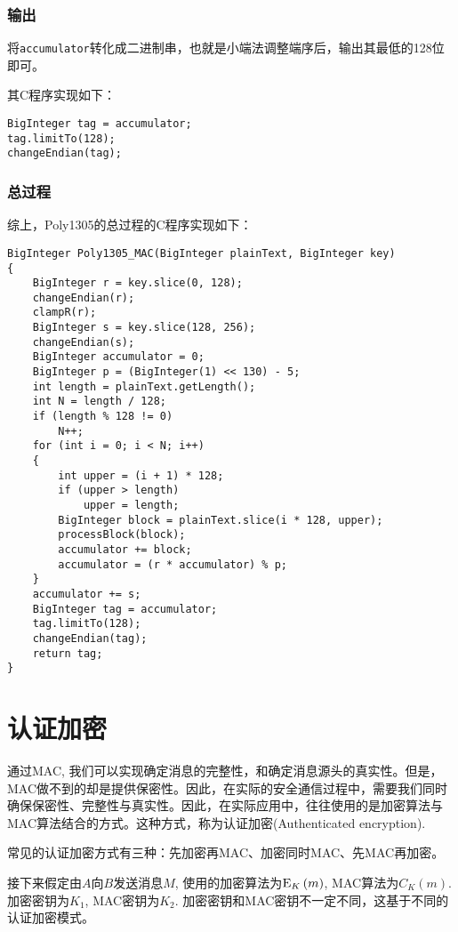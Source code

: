 \subsubsection{输出}
将\verb`accumulator`转化成二进制串，也就是小端法调整端序后，输出其最低的128位即可。\par
其C程序实现如下：
\begin{prove}
	\begin{verbatim}
BigInteger tag = accumulator;
tag.limitTo(128);
changeEndian(tag);
	\end{verbatim}
\end{prove}
\subsubsection{总过程}
综上，Poly1305的总过程的C程序实现如下：
\begin{prove}
	\begin{verbatim}
BigInteger Poly1305_MAC(BigInteger plainText, BigInteger key)
{
    BigInteger r = key.slice(0, 128);
    changeEndian(r);
    clampR(r);
    BigInteger s = key.slice(128, 256);
    changeEndian(s);
    BigInteger accumulator = 0;
    BigInteger p = (BigInteger(1) << 130) - 5;
    int length = plainText.getLength();
    int N = length / 128;
    if (length % 128 != 0)
        N++;
    for (int i = 0; i < N; i++)
    {
        int upper = (i + 1) * 128;
        if (upper > length)
            upper = length;
        BigInteger block = plainText.slice(i * 128, upper);
        processBlock(block);
        accumulator += block;
        accumulator = (r * accumulator) % p;
    }
    accumulator += s;
    BigInteger tag = accumulator;
    tag.limitTo(128);
    changeEndian(tag);
    return tag;
}
	\end{verbatim}
\end{prove}
\section{认证加密}
通过MAC, 我们可以实现确定消息的完整性，和确定消息源头的真实性。但是，MAC做不到的却是提供保密性。因此，在实际的安全通信过程中，需要我们同时确保保密性、完整性与真实性。因此，在实际应用中，往往使用的是加密算法与MAC算法结合的方式。这种方式，称为认证加密(Authenticated encryption).\par
常见的认证加密方式有三种：先加密再MAC、加密同时MAC、先MAC再加密。\par
接下来假定由$A$向$B$发送消息$M$, 使用的加密算法为${\mathrm{E}_{K}\left({m}\right)}$, MAC算法为$C_K(m)$. 加密密钥为$K_1$, MAC密钥为$K_2$. 加密密钥和MAC密钥不一定不同，这基于不同的认证加密模式。
